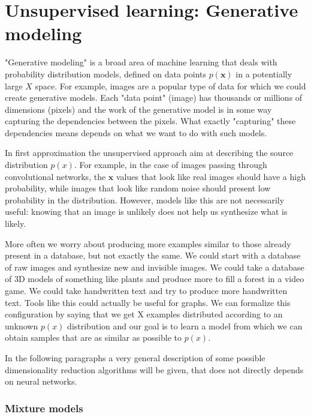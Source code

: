 \section{Unsupervised learning: Generative modeling}
%
"Generative modeling" is a broad area of machine learning that deals with probability distribution models, defined on data points $p(\bm{x})$ in a potentially large $X$ space. For example, images are a popular type of data for which we could create generative models. Each "data point" (image) has thousands or millions of dimensions (pixels) and the work of the generative model is in some way capturing the dependencies between the pixels. What exactly "capturing" these dependencies means depends on what we want to do with such models.

In first approximation the unsupervised approach aim at describing the source distribution $p(x)$.
For example, in the case of images passing through convolutional networks, the $\bm{x}$ values that look like real images should have a high probability, while images that look like random noise should present low probability in the distribution. However, models like this are not necessarily useful: knowing that an image is unlikely does not help us synthesize what is likely. 

More often we worry about producing more examples similar to those already present in a database, but not exactly the same. We could start with a database of raw images and synthesize new and invisible images. We could take a database of 3D models of something like plants and produce more to fill a forest in a video game. We could take handwritten text and try to produce more handwritten text. Tools like this could actually be useful for graphs. We can formalize this configuration by saying that we get X examples distributed according to an unknown $p(x)$ distribution and our goal is to learn a model from which we can obtain samples that are as similar as possible to $p(x)$.

In the following paragraphs a very general description of some possible dimensionality reduction algorithms will be given, that does not directly depends on neural networks.

%

\subsubsection{Mixture models}

